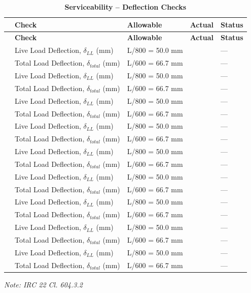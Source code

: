 \documentclass[12pt,a4paper]{report}
\numberwithin{table}{chapter}
\numberwithin{figure}{chapter}
\begin{document}
\vspace{1em}
\begin{longtable}{|C{2.5cm}|L{3.5cm}|C{3.5cm}|>{\centering\arraybackslash}p{3.5cm}|C{2.5cm}|}
\caption{\textbf{Serviceability -- Deflection Checks}}\\
\hline
\textbf{} & \textbf{Check} & \textbf{Allowable} & \textbf{Actual} & \textbf{Status} \\[6pt]
\hline
\endfirsthead
\hline
\textbf{} & \textbf{Check} & \textbf{Allowable} & \textbf{Actual} & \textbf{Status} \\[6pt]
\hline
\endhead
{} & Live Load Deflection, $\delta_{LL}$ (mm) & L/800 = 50.0 mm &  & --- \\[6pt]
 & Total Load Deflection, $\delta_{total}$ (mm) & L/600 = 66.7 mm &  & --- \\[6pt]
\hline
{} & Live Load Deflection, $\delta_{LL}$ (mm) & L/800 = 50.0 mm &  & --- \\[6pt]
 & Total Load Deflection, $\delta_{total}$ (mm) & L/600 = 66.7 mm &  & --- \\[6pt]
\hline
{} & Live Load Deflection, $\delta_{LL}$ (mm) & L/800 = 50.0 mm &  & --- \\[6pt]
 & Total Load Deflection, $\delta_{total}$ (mm) & L/600 = 66.7 mm &  & --- \\[6pt]
\hline
{} & Live Load Deflection, $\delta_{LL}$ (mm) & L/800 = 50.0 mm &  & --- \\[6pt]
 & Total Load Deflection, $\delta_{total}$ (mm) & L/600 = 66.7 mm &  & --- \\[6pt]
\hline
{} & Live Load Deflection, $\delta_{LL}$ (mm) & L/800 = 50.0 mm &  & --- \\[6pt]
 & Total Load Deflection, $\delta_{total}$ (mm) & L/600 = 66.7 mm &  & --- \\[6pt]
\hline
{} & Live Load Deflection, $\delta_{LL}$ (mm) & L/800 = 50.0 mm &  & --- \\[6pt]
 & Total Load Deflection, $\delta_{total}$ (mm) & L/600 = 66.7 mm &  & --- \\[6pt]
\hline
{} & Live Load Deflection, $\delta_{LL}$ (mm) & L/800 = 50.0 mm &  & --- \\[6pt]
 & Total Load Deflection, $\delta_{total}$ (mm) & L/600 = 66.7 mm &  & --- \\[6pt]
\hline
{} & Live Load Deflection, $\delta_{LL}$ (mm) & L/800 = 50.0 mm &  & --- \\[6pt]
 & Total Load Deflection, $\delta_{total}$ (mm) & L/600 = 66.7 mm &  & --- \\[6pt]
\hline
{} & Live Load Deflection, $\delta_{LL}$ (mm) & L/800 = 50.0 mm &  & --- \\[6pt]
 & Total Load Deflection, $\delta_{total}$ (mm) & L/600 = 66.7 mm &  & --- \\[6pt]
\hline
\end{longtable}
\noindent\textit{Note: IRC 22 Cl. 604.3.2}
\end{document}
